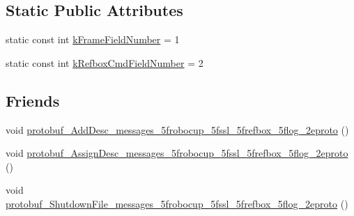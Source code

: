 \subsection*{Static Public Attributes}
\begin{DoxyCompactItemize}
\item 
static const int \hyperlink{class_log___frame_a725a14cb25e56b55dc5d04f48e2fc5a6}{k\-Frame\-Field\-Number} = 1
\item 
static const int \hyperlink{class_log___frame_a5a86fefd35642a42faaeac71f3e4a05a}{k\-Refbox\-Cmd\-Field\-Number} = 2
\end{DoxyCompactItemize}
\subsection*{Friends}
\begin{DoxyCompactItemize}
\item 
void \hyperlink{class_log___frame_a7a23ca0902a36bf9b79e1b84e0bd7dd9}{protobuf\-\_\-\-Add\-Desc\-\_\-messages\-\_\-5frobocup\-\_\-5fssl\-\_\-5frefbox\-\_\-5flog\-\_\-2eproto} ()
\item 
void \hyperlink{class_log___frame_aa0df9fa5deee64b6f7b271534344c27c}{protobuf\-\_\-\-Assign\-Desc\-\_\-messages\-\_\-5frobocup\-\_\-5fssl\-\_\-5frefbox\-\_\-5flog\-\_\-2eproto} ()
\item 
void \hyperlink{class_log___frame_a6dbbe3307f22c504591e58107560d1f2}{protobuf\-\_\-\-Shutdown\-File\-\_\-messages\-\_\-5frobocup\-\_\-5fssl\-\_\-5frefbox\-\_\-5flog\-\_\-2eproto} ()
\end{DoxyCompactItemize}


